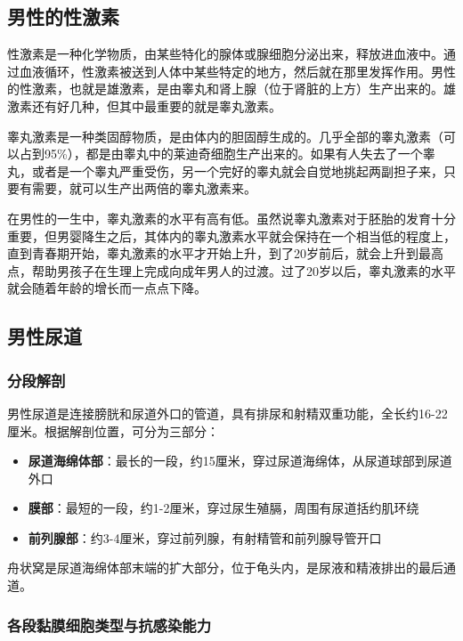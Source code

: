 \subsection{男性的性激素}

性激素是一种化学物质，由某些特化的腺体或腺细胞分泌出来，释放进血液中。通过血液循环，性激素被送到人体中某些特定的地方，然后就在那里发挥作用。男性的性激素，也就是雄激素，是由睾丸和肾上腺（位于肾脏的上方）生产出来的。雄激素还有好几种，但其中最重要的就是睾丸激素。

睾丸激素是一种类固醇物质，是由体内的胆固醇生成的。几乎全部的睾丸激素（可以占到95\%），都是由睾丸中的莱迪奇细胞生产出来的。如果有人失去了一个睾丸，或者是一个睾丸严重受伤，另一个完好的睾丸就会自觉地挑起两副担子来，只要有需要，就可以生产出两倍的睾丸激素来。

在男性的一生中，睾丸激素的水平有高有低。虽然说睾丸激素对于胚胎的发育十分重要，但男婴降生之后，其体内的睾丸激素水平就会保持在一个相当低的程度上，直到青春期开始，睾丸激素的水平才开始上升，到了20岁前后，就会上升到最高点，帮助男孩子在生理上完成向成年男人的过渡。过了20岁以后，睾丸激素的水平就会随着年龄的增长而一点点下降。

\subsection{男性尿道}
\subsubsection{分段解剖}

男性尿道是连接膀胱和尿道外口的管道，具有排尿和射精双重功能，全长约16-22厘米。根据解剖位置，可分为三部分：

\begin{itemize}
    \item \textbf{尿道海绵体部}：最长的一段，约15厘米，穿过尿道海绵体，从尿道球部到尿道外口
    \item \textbf{膜部}：最短的一段，约1-2厘米，穿过尿生殖膈，周围有尿道括约肌环绕
    \item \textbf{前列腺部}：约3-4厘米，穿过前列腺，有射精管和前列腺导管开口
\end{itemize}

舟状窝是尿道海绵体部末端的扩大部分，位于龟头内，是尿液和精液排出的最后通道。

\subsubsection{各段黏膜细胞类型与抗感染能力}

